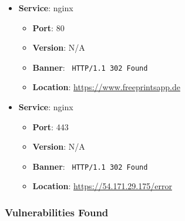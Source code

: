 \documentclass{article}
\begin{document}
\begin{itemize}
    
        \item \textbf{Service}: nginx
        \begin{itemize}
            \item \textbf{Port}: 80
            \item \textbf{Version}:  N/A 
            \item \textbf{Banner}: \texttt{
                HTTP/1.1 302 Found
            }
            \item \textbf{Location}: \href{ https://www.freeprintsapp.de }{ https://www.freeprintsapp.de }
        \end{itemize}
    
        \item \textbf{Service}: nginx
        \begin{itemize}
            \item \textbf{Port}: 443
            \item \textbf{Version}:  N/A 
            \item \textbf{Banner}: \texttt{
                HTTP/1.1 302 Found
            }
            \item \textbf{Location}: \href{ https://54.171.29.175/error }{ https://54.171.29.175/error }
        \end{itemize}
    
\end{itemize}


\subsubsection*{Vulnerabilities Found}
\end{document}
